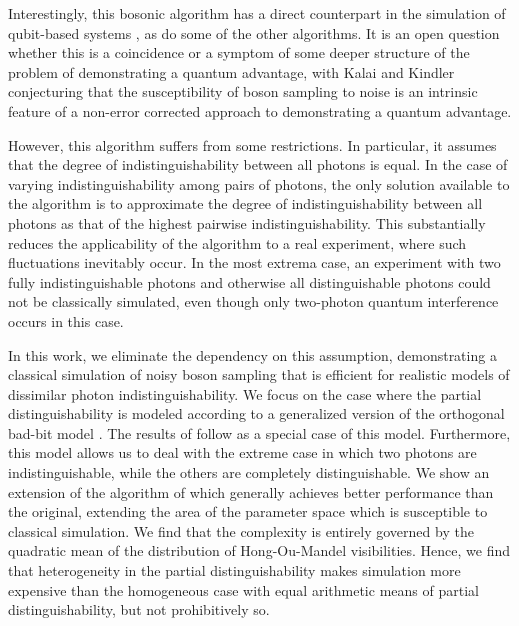 \documentclass[10pt,aps,pra,twocolumn,superscriptaddress]{revtex4-2}
\begin{document}
Interestingly, this bosonic algorithm has a direct counterpart in the simulation of qubit-based systems \cite{Aharonov2023}, as do some of the other algorithms. It is an open question whether this is a coincidence or a symptom of some deeper structure of the problem of demonstrating a quantum advantage, with Kalai and Kindler conjecturing \cite{KalaiKindler2014} that the susceptibility of boson sampling to noise is an intrinsic feature of a non-error corrected approach to demonstrating a quantum advantage. 

However, this algorithm \cite{renema2018efficient} suffers from some restrictions. In particular, it assumes that the degree of indistinguishability between all photons is equal. In the case of varying indistinguishability among pairs of photons, the only solution available to the algorithm is to approximate the degree of indistinguishability between all photons as that of the highest pairwise indistinguishability. This substantially reduces the applicability of the algorithm to a real experiment, where such fluctuations inevitably occur. In the most extrema case, an experiment with two fully indistinguishable photons and otherwise all distinguishable photons could not be classically simulated, even though only two-photon quantum interference occurs in this case.

In this work, we eliminate the dependency on this assumption, demonstrating a classical simulation of noisy boson sampling that is efficient for realistic models of dissimilar photon indistinguishability. We focus on the case where the partial distinguishability is modeled according to a generalized version of the orthogonal bad-bit model \cite{sparrow2018phd_thesis,marshall2022distillation}. The results of \cite{renema2018efficient} follow as a special case of this model. Furthermore, this model allows us to deal with the extreme case in which two photons are indistinguishable, while the others are completely distinguishable. We show an extension of the algorithm of \cite{renema2018efficient} which generally achieves better performance than the original, extending the area of the parameter space which is susceptible to classical simulation.
We find that the complexity is entirely governed by the quadratic mean of the distribution of Hong-Ou-Mandel \cite{hong1987measurement} visibilities. 
Hence, we find that heterogeneity in the partial distinguishability makes simulation more expensive than the homogeneous case with equal arithmetic means of partial distinguishability, but not prohibitively so.
\end{document}
